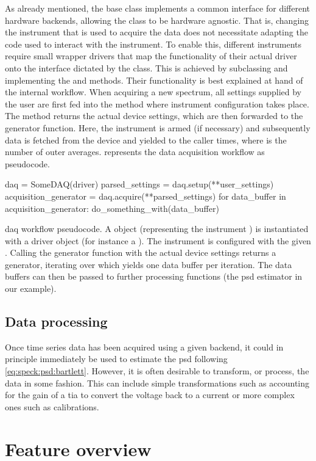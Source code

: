 As already mentioned, the  base class implements a common interface for different hardware backends, allowing the  class to be hardware agnostic.
That is, changing the instrument that is used to acquire the data does not necessitate adapting the code used to interact with the instrument.
To enable this, different instruments require small wrapper drivers that map the functionality of their actual driver onto the interface dictated by the  class.
This is achieved by subclassing  and implementing the  and  methods.
Their functionality is best explained at hand of the internal workflow.
When acquiring a new spectrum, all settings supplied by the user are first fed into the  method where instrument configuration takes place.
The method returns the actual device settings,
which are then forwarded to the  generator function.
Here, the instrument is armed (if necessary) and subsequently data is fetched from the device and yielded to the caller  times, where  is the number of outer averages.
 represents the data acquisition workflow as pseudocode.

\begin{listing}
    \begin{py}
        daq = SomeDAQ(driver)
        parsed_settings = daq.setup(**user_settings)
        acquisition_generator = daq.acquire(**parsed_settings)
        for data_buffer in acquisition_generator:
            do_something_with(data_buffer)
    \end{py}
    \caption[\gls{daq} workflow pseudocode]{
        \gls{daq} workflow pseudocode.
        A  object (representing the instrument ) is instantiated with a driver object (for instance a \qcodes {}).
        The instrument is configured with the given .
        Calling the generator function  with the actual device settings returns a generator, iterating over which yields one data buffer per iteration.
        The data buffers can then be passed to further processing functions (the \gls{psd} estimator in our example).
    }
    \label{lst:speck:daq_workflow}
\end{listing}

\subsection{Data processing}\label{sec:speck:software:design:processing}
Once time series data has been acquired using a given  backend, it could in principle immediately be used to estimate the \gls{psd} following \cref{eq:speck:psd:bartlett}.
However, it is often desirable to transform, or process, the data in some fashion.
This can include simple transformations such as accounting for the gain of a \gls{tia} to convert the voltage back to a current
or more complex ones such as calibrations.

\section{Feature overview}\label{sec:speck:software:features}

